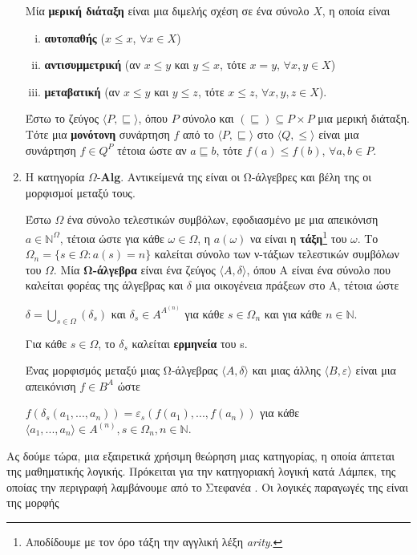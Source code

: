 \documentclass [a4paper,11pt] {book}
\theoremstyle{definition}
\theoremstyle{definition}
\begin{document}
\begin{enumerate}
Μία \textbf{μερική διάταξη} είναι μια διμελής σχέση σε ένα σύνολο $X$, η οποία είναι
\begin{enumerate} [i.]
\item  \textbf{αυτοπαθής} ($x\leq x$, $\forall x \in X$)
\item \textbf{αντισυμμετρική} (αν $x\leq y$ και $y \leq x$, τότε $x=y$, $\forall x,y \in X$)
\item \textbf{μεταβατική} (αν $x\leq y$ και $y\leq z$, τότε $x\leq z$, $\forall x,y,z \in X$).
\end{enumerate}
Έστω το ζεύγος $\langle P, \sqsubseteq \rangle$, όπου $P$ σύνολο και $(\sqsubseteq)\subseteq P \times P$ μια μερική διάταξη. Τότε μια \textbf{μονότονη} συνάρτηση $f$ από το $\langle P, \sqsubseteq \rangle$ στο $\langle Q, \leqslant \rangle$ είναι μια συνάρτηση $f\in Q^P$ τέτοια ώστε αν $a \sqsubseteq b$, τότε $f(a)\leqslant f(b)$, $\forall a,b\in P$.
\item Η κατηγορία $\Omega$-\textbf{Alg}. Αντικείμενά της είναι οι Ω-άλγεβρες και βέλη της οι μορφισμοί μεταξύ τους.

Έστω $\Omega$ ένα σύνολο τελεστικών συμβόλων, εφοδιασμένο με μια απεικόνιση $a \in \mathbb{N}^{\Omega}$, τέτοια ώστε για κάθε $\omega \in \Omega$, η $a(\omega)$ να είναι η \textbf{τάξη}\footnote{Αποδίδουμε με τον όρο τάξη την αγγλική λέξη \textit{arity}.} του $\omega$. Το $\Omega_{n}=\{s \in \Omega : a(s)=n\}$ καλείται σύνολο των ν-τάξιων τελεστικών συμβόλων του $\Omega$. Μία \textbf{Ω-άλγεβρα} είναι ένα ζεύγος $\langle A,\delta \rangle$, όπου Α είναι ένα σύνολο που καλείται φορέας της άλγεβρας και $\delta$ μια οικογένεια πράξεων στο Α, τέτοια ώστε \begin{center} $\delta=\bigcup_{s \in \Omega}(\delta_{s})$ και $\delta_{s} \in A^{A^{(n)}}$ για κάθε $s \in \Omega_{n}$ και για κάθε $n \in \mathbb{N}$. \end{center}
Για κάθε $s \in \Omega$, το $\delta_{s}$ καλείται \textbf{ερμηνεία} του s.

Ένας μορφισμός μεταξύ μιας Ω-άλγεβρας $\langle A,\delta \rangle$ και μιας άλλης $\langle B,\varepsilon \rangle$ είναι μια απεικόνιση $f \in B^{A}$ ώστε
\begin{center}
$f(\delta_{s}(a_{1},...,a_{n}))=\varepsilon_{s}(f(a_{1}),...,f(a_{n})) $ για κάθε $ \langle a_{1},...,a_{n} \rangle \in A^{(n)}, s \in \Omega_{n}, n \in \mathbb{N}$.
\end{center}
\end{enumerate}
Ας δούμε τώρα, μια εξαιρετικά χρήσιμη θεώρηση μιας κατηγορίας, η οποία άπτεται της μαθηματικής λογικής. Πρόκειται για την κατηγοριακή λογική κατά Λάμπεκ, της οποίας την περιγραφή λαμβάνουμε από το Στεφανέα \citep{stefaneas}. Οι λογικές παραγωγές της είναι της μορφής
\end{document}
